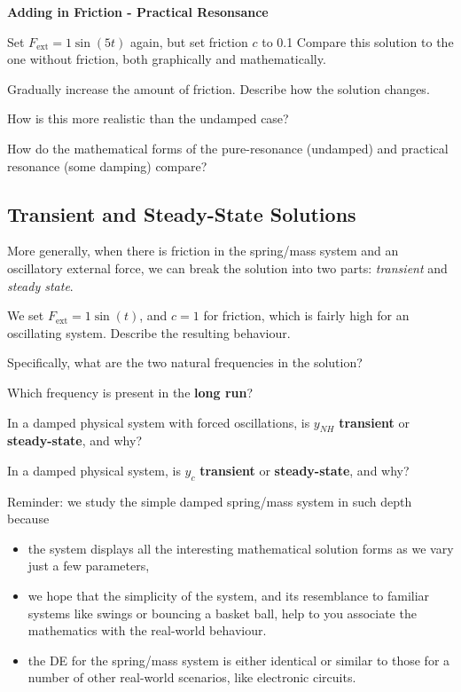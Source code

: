 \newpage


{\bf Adding in Friction - Practical Resonsance}

Set $F_{\mbox{ext}} = 1 \sin(5t)$ again, but set friction $c$ to 0.1 Compare this
solution to the one without friction, both graphically and
mathematically.

\vfill

Gradually increase the amount of friction.  Describe how the solution
changes.

\vfill

How is this more realistic than the undamped case?

\vfill

How do the mathematical forms of the pure-resonance (undamped) and
practical resonance (some damping) compare?

\vfill

\newpage

\subsection*{Transient and Steady-State Solutions}

More generally, when there is friction in the spring/mass system and
an oscillatory external force, we can break the solution into two
parts: {\em transient} and {\em steady state}.

We set $F_{\mbox{ext}} = 1 \sin(t)$, and $c = 1$ for friction, which is fairly
high for an oscillating system.  Describe the resulting behaviour.

\vfill

Specifically, what are the two natural frequencies in the solution?

\vfill

Which frequency is present in the {\bf long run}?

\vfill

\newpage

In a damped physical system with forced oscillations, is $y_{NH}$ {\bf
  transient} or {\bf steady-state}, and why?

\vfill

In a damped physical system, is $y_c$ {\bf transient} or {\bf
  steady-state}, and why?

\vfill

\newpage

Reminder: we study the simple damped spring/mass system in such depth
because
\begin{itemize}
\item the system displays all the interesting mathematical solution
  forms as we vary just a few parameters, 
\item we hope that the simplicity of the system, and its resemblance
  to familiar systems like swings or bouncing a basket ball, help to
  you associate the mathematics with the real-world behaviour.
\item the DE for the spring/mass system is either identical or similar
  to those for a number of other real-world scenarios, like electronic
  circuits.
\end{itemize}


